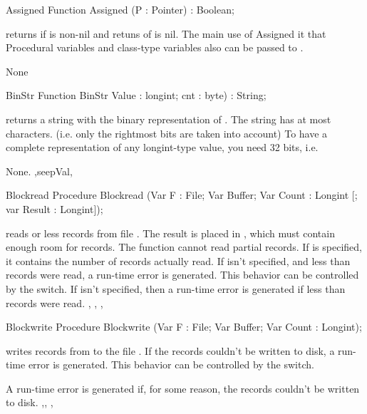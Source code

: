 \documentclass{report}
\begin{document}
\html{}
\begin{function}{Assigned}
\Declaration
Function Assigned (P : Pointer) : Boolean;

\Description
  returns  if  is non-nil 
and retuns  of  is nil. 
The main use of Assigned it that Procedural variables and 
class-type variables also can be passed to .

\Errors
None
\SeeAlso

\end{function}
\begin{function}{BinStr}
\Declaration
Function BinStr Value : longint; cnt : byte) : String;

\Description
{} returns a string with the binary representation
of . The string has at most  characters.
(i.e. only the  rightmost bits are taken into account)
To have a complete representation of any longint-type value, you need 32
bits, i.e. 

\Errors
None.
\SeeAlso
{},seep{Val},
\end{function}
\html{}
\begin{procedure}{Blockread}
\Declaration
Procedure Blockread (Var F : File; Var Buffer; Var Count : Longint [; var
Result : Longint]);

\Description
{} reads  or less records from file . The
result is placed in , which must contain enough room for
 records. The function cannot read partial records. 
If  is specified, it contains the number of records actually
read. If  isn't specified, and less than  records were
read, a run-time error is generated. This behavior can be controlled by the
 switch. 
\Errors
If  isn't specified, then a run-time error is generated if less
than  records were read.
\SeeAlso
{}, , , 
\end{procedure}
\html{}
\begin{procedure}{Blockwrite}
\Declaration
Procedure Blockwrite (Var F : File; Var Buffer; Var Count : Longint);

\Description
{} writes  records from  to the file
 . 
If the records couldn't be written to disk, a run-time error is generated.
This behavior can be controlled by the  switch. 

\Errors
A run-time error is generated if, for some reason, the records couldn't be
written to disk.
\SeeAlso
{},, , 
\end{procedure}
\end{document}
